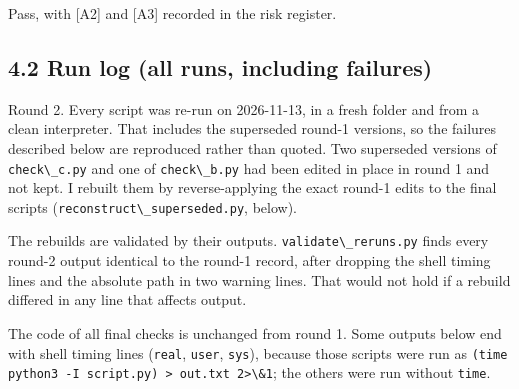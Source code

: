 \documentclass[11pt,a4paper]{article}
\newcommand{\passthrough}[1]{#1}
\begin{document}
\begin{enumerate}
  Pass, with {[}A2{]} and {[}A3{]} recorded in the risk register.
\end{enumerate}

\hypertarget{run-log-all-runs-including-failures}{%
\subsection{4.2 Run log (all runs, including
failures)}\label{run-log-all-runs-including-failures}}

Round 2. Every script was re-run on 2026-11-13, in a fresh folder and
from a clean interpreter. That includes the superseded round-1 versions,
so the failures described below are reproduced rather than quoted. Two
superseded versions of \passthrough{\lstinline!check\_c.py!} and one of
\passthrough{\lstinline!check\_b.py!} had been edited in place in round
1 and not kept. I rebuilt them by reverse-applying the exact round-1
edits to the final scripts
(\passthrough{\lstinline!reconstruct\_superseded.py!}, below).

The rebuilds are validated by their outputs.
\passthrough{\lstinline!validate\_reruns.py!} finds every round-2 output
identical to the round-1 record, after dropping the shell timing lines
and the absolute path in two warning lines. That would not hold if a
rebuild differed in any line that affects output.

The code of all final checks is unchanged from round 1. Some outputs
below end with shell timing lines (\passthrough{\lstinline!real!},
\passthrough{\lstinline!user!}, \passthrough{\lstinline!sys!}), because
those scripts were run as
\passthrough{\lstinline!(time python3 -I script.py) > out.txt 2>\&1!};
the others were run without \passthrough{\lstinline!time!}.
\end{document}
